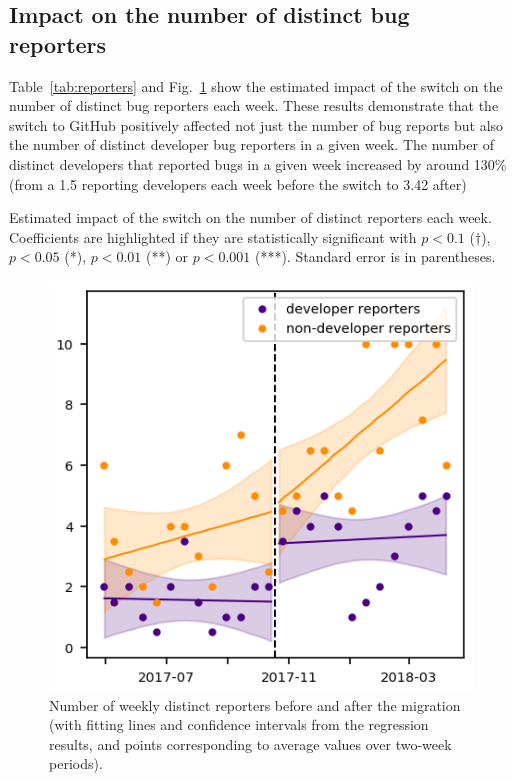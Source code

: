 \documentclass[conference]{IEEEtran}
\begin{document}
\subsection{Impact on the number of distinct bug reporters}

Table~\ref{tab:reporters} and Fig.~\ref{reporter_nb_rd} show the estimated impact of the switch on the number of distinct bug reporters each week. These results demonstrate that the switch to GitHub positively affected not just the number of bug reports but also the number of distinct developer bug reporters in a given week. The number of distinct developers that reported bugs in a given week increased by around 130\% (from a 1.5 reporting developers each week before the switch to 3.42 after)

\begin{table}
\centering
\caption{Estimated impact of the switch on the number of distinct reporters each week. Coefficients are highlighted if they are statistically significant with $p<0.1$ ($\dagger$), $p<0.05$ (*), $p<0.01$ (**) or $p<0.001$ (***). Standard error is in parentheses.}
\label{tab:reporters}

\end{table}

\begin{figure}
\includegraphics{reporter_nb_rd.png}
\caption{Number of weekly distinct reporters before and after the migration (with fitting lines and confidence intervals from the regression results, and points corresponding to average values over two-week periods).} \label{reporter_nb_rd}
\end{figure}
\end{document}
